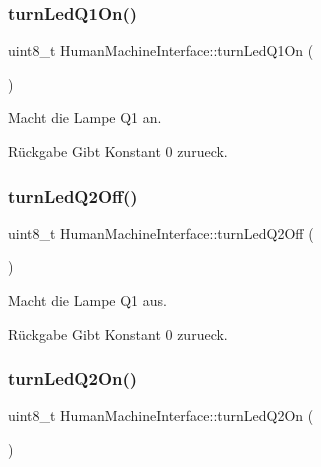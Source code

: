 \subsubsection{\texorpdfstring{turn\+Led\+Q1\+On()}{turnLedQ1On()}}
{\footnotesize\ttfamily uint8\+\_\+t Human\+Machine\+Interface\+::turn\+Led\+Q1\+On (\begin{DoxyParamCaption}{ }\end{DoxyParamCaption})}

Macht die Lampe Q1 an.

\begin{DoxyReturn}{Rückgabe}
Gibt Konstant 0 zurueck. 
\end{DoxyReturn}
\hypertarget{class_human_machine_interface_a73d76c6dd54b115fa8df9cf5f2b0d2aa}{}\label{class_human_machine_interface_a73d76c6dd54b115fa8df9cf5f2b0d2aa} 
\subsubsection{\texorpdfstring{turn\+Led\+Q2\+Off()}{turnLedQ2Off()}}
{\footnotesize\ttfamily uint8\+\_\+t Human\+Machine\+Interface\+::turn\+Led\+Q2\+Off (\begin{DoxyParamCaption}{ }\end{DoxyParamCaption})}

Macht die Lampe Q1 aus.

\begin{DoxyReturn}{Rückgabe}
Gibt Konstant 0 zurueck. 
\end{DoxyReturn}
\hypertarget{class_human_machine_interface_a9fcfd97db711e6954cbfeec8f93efb58}{}\label{class_human_machine_interface_a9fcfd97db711e6954cbfeec8f93efb58} 
\subsubsection{\texorpdfstring{turn\+Led\+Q2\+On()}{turnLedQ2On()}}
{\footnotesize\ttfamily uint8\+\_\+t Human\+Machine\+Interface\+::turn\+Led\+Q2\+On (\begin{DoxyParamCaption}{ }\end{DoxyParamCaption})}

